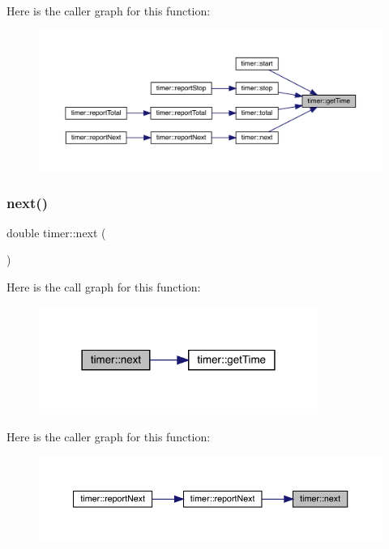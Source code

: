 Here is the caller graph for this function\+:\nopagebreak
\begin{figure}[H]
\begin{center}
\leavevmode
\includegraphics[width=350pt]{structtimer_a597befd9cd3b4d37419f91e5380e00ae_icgraph}
\end{center}
\end{figure}
\mbox{\label{structtimer_a3528919bd98e23283cc0046fc5406ff6}} 
\subsubsection{\texorpdfstring{next()}{next()}}
{\footnotesize\ttfamily double timer\+::next (\begin{DoxyParamCaption}{ }\end{DoxyParamCaption})\hspace{0.3cm}{\ttfamily [inline]}}

Here is the call graph for this function\+:\nopagebreak
\begin{figure}[H]
\begin{center}
\leavevmode
\includegraphics[width=258pt]{structtimer_a3528919bd98e23283cc0046fc5406ff6_cgraph}
\end{center}
\end{figure}
Here is the caller graph for this function\+:\nopagebreak
\begin{figure}[H]
\begin{center}
\leavevmode
\includegraphics[width=350pt]{structtimer_a3528919bd98e23283cc0046fc5406ff6_icgraph}
\end{center}
\end{figure}
\mbox{\label{structtimer_a8d9f92edc40c64921b36cc8d1ef5f5a5}} 
